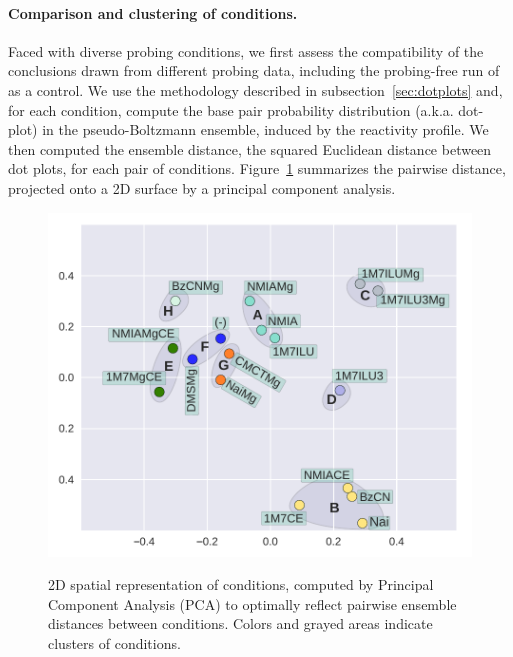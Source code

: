 \documentclass[a4,center,fleqn]{NAR}
\newcommand{\Software}[1]{\text{\ttfamily\bfseries #1}}
\newcommand{\OurTool}{\Software{IPANEMAP}\xspace}
\begin{document}
\paragraph{Comparison and clustering of conditions.}
Faced with diverse probing conditions, we first assess the compatibility of the conclusions drawn from different probing data, including the probing-free run of \OurTool as a control. We use the methodology described in subsection~\ref{sec:dotplots} and, for each condition, compute the base pair probability distribution (a.k.a. dot-plot) in the  pseudo-Boltzmann ensemble, induced by the reactivity profile. We then computed the ensemble distance, the squared Euclidean distance between dot plots, for each pair of conditions. Figure~\ref{fig:PCA} summarizes the pairwise distance, projected onto a 2D surface by a principal component analysis.


\begin{figure}
	{\centering \includegraphics[width=\linewidth]{graphs/didy/PCA}\\}%
	
	\caption{2D spatial representation of conditions, computed by Principal Component Analysis (PCA) to optimally reflect pairwise ensemble distances between conditions. Colors and grayed areas indicate clusters of conditions.}\label{fig:PCA}
\end{figure}
\end{document}
